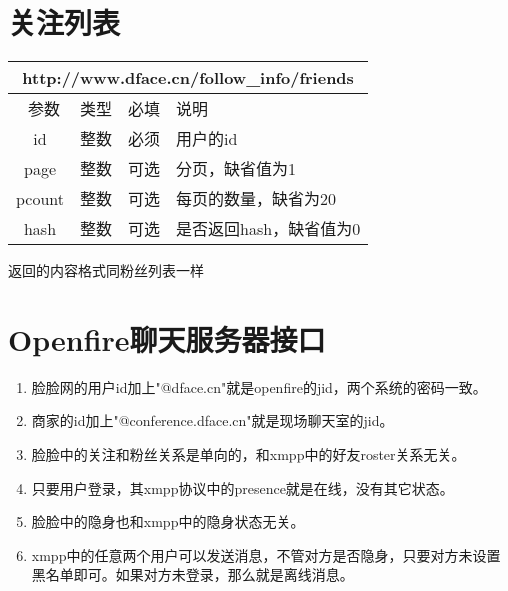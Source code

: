 \documentclass[cs4size]{ctexartutf8}
\begin{document}
\section{关注列表}

\begin{table}[H]
   \begin{center}
\begin{tabular}{|c|c|c|p{12cm}|}
\hline
\multicolumn{4}{|c|}{http://www.dface.cn/follow\_info/friends} \\
\hline\hline
 \  参数  & 类型 & 必填 &  说明  \\
\hline
 id  & 整数 & 必须 &  用户的id\\
   \hline
 page  & 整数 & 可选 & 分页，缺省值为1\\ 
 \hline
 pcount  & 整数 & 可选 & 每页的数量，缺省为20\\ 
     \hline
 hash  & 整数 & 可选 & 是否返回hash，缺省值为0\\ 
\hline

\end{tabular}
   \end{center}
\end{table}

返回的内容格式同粉丝列表一样


\section{Openfire聊天服务器接口}




\begin{enumerate}
\item 脸脸网的用户id加上"@dface.cn"就是openfire的jid，两个系统的密码一致。
\item 商家的id加上"@conference.dface.cn"就是现场聊天室的jid。
\item 脸脸中的关注和粉丝关系是单向的，和xmpp中的好友roster关系无关。
\item 只要用户登录，其xmpp协议中的presence就是在线，没有其它状态。
\item 脸脸中的隐身也和xmpp中的隐身状态无关。
\item xmpp中的任意两个用户可以发送消息，不管对方是否隐身，只要对方未设置黑名单即可。如果对方未登录，那么就是离线消息。
\end{enumerate}



\newpage
\end{document}
